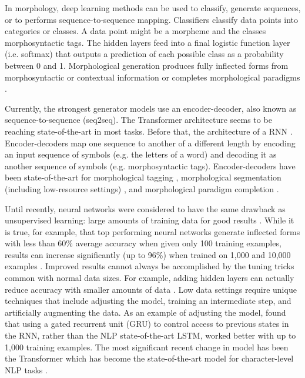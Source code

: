 \documentclass[12pt]{article}
\begin{document}
In morphology, deep learning methods can be used to classify, generate sequences, or to performs sequence-to-sequence mapping. Classifiers classify data points into categories or classes. A data point might be a morpheme and the classes morphosyntactic tags. 
The hidden layers feed into a final logistic function layer (i.e. softmax) that outputs a prediction of each possible class as a probability between 0 and 1. Morphological generation produces fully inflected forms from morphosyntactic or contextual information \cite{cotterell_conll-sigmorphon_2017} or completes morphological paradigms \cite{malouf_generating_2016}.

Currently, the strongest generator models use an encoder-decoder, also known as sequence-to-sequence (seq2seq). The Transformer \cite{vaswani_attention_2017} architecture seems to be reaching state-of-the-art in most tasks. Before that, the architecture of a RNN \cite{sutskever2014,kann_neural_2016}. Encoder-decoders map one sequence to another of a different length by encoding an input sequence of symbols (e.g. the letters of a word) and decoding it as another sequence of symbols (e.g. morphosyntactic tags). Encoder-decoders have been state-of-the-art for morphological tagging \cite{heigold_extensive_2017}, morphological segmentation (including low-resource settings) \cite{kann_fortification_2018}, and morphological paradigm completion \cite{cotterell_conllsigmorphon_2018}. 

Until recently, neural networks were considered to have the same drawback as unsupervised learning: large amounts of training data for good results \cite{cotterell_conllsigmorphon_2018}. While it is true, for example, that top performing neural networks generate inflected forms with less than 60\% average accuracy when given only 100 training examples, results can increase significantly (up to 96\%) when trained on 1,000 and 10,000 examples \cite{cotterell_sigmorphon_2016,cotterell_conll-sigmorphon_2017,cotterell_conllsigmorphon_2018}. Improved results cannot always be accomplished by the tuning tricks common with normal data sizes. For example, adding hidden layers can actually reduce accuracy with smaller amounts of data \cite{cotterell_conll-sigmorphon_2017}. Low data settings require unique techniques that include adjusting the model, training an intermediate step, and artificially augmenting the data. As an example of adjusting the model,  found that using a gated recurrent unit (GRU) to control access to previous states in the RNN, rather than the NLP state-of-the-art LSTM, 
worked better with up to 1,000 training examples. The most significant recent change in model has been the Transformer \cite{vaswani_attention_2017} which has become the state-of-the-art model for character-level NLP tasks \cite{wu2020applying}.
\end{document}
